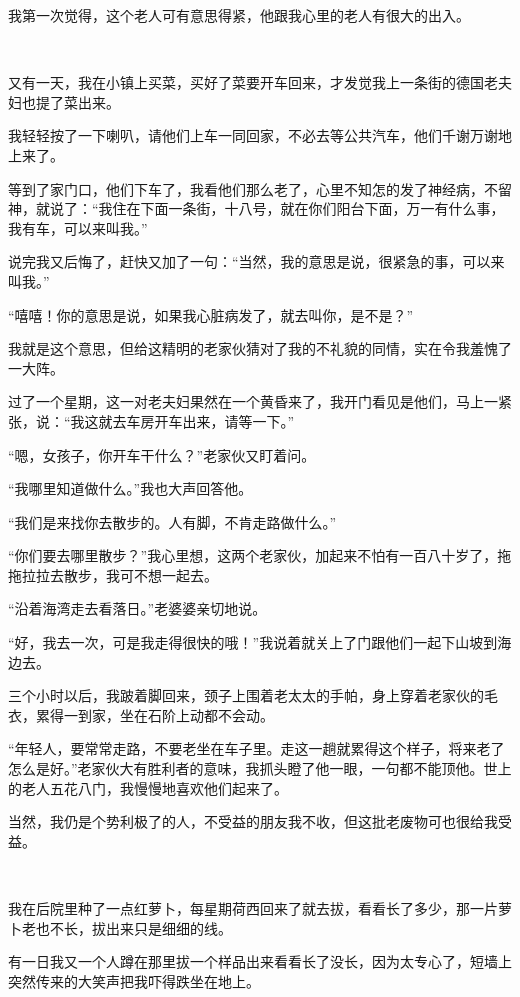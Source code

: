 \par 我第一次觉得，这个老人可有意思得紧，他跟我心里的老人有很大的出入。
\par  
\par 又有一天，我在小镇上买菜，买好了菜要开车回来，才发觉我上一条街的德国老夫妇也提了菜出来。
\par 我轻轻按了一下喇叭，请他们上车一同回家，不必去等公共汽车，他们千谢万谢地上来了。
\par 等到了家门口，他们下车了，我看他们那么老了，心里不知怎的发了神经病，不留神，就说了：“我住在下面一条街，十八号，就在你们阳台下面，万一有什么事，我有车，可以来叫我。”
\par 说完我又后悔了，赶快又加了一句：“当然，我的意思是说，很紧急的事，可以来叫我。”
\par “嘻嘻！你的意思是说，如果我心脏病发了，就去叫你，是不是？”
\par 我就是这个意思，但给这精明的老家伙猜对了我的不礼貌的同情，实在令我羞愧了一大阵。
\par 过了一个星期，这一对老夫妇果然在一个黄昏来了，我开门看见是他们，马上一紧张，说：“我这就去车房开车出来，请等一下。”
\par “嗯，女孩子，你开车干什么？”老家伙又盯着问。
\par “我哪里知道做什么。”我也大声回答他。
\par “我们是来找你去散步的。人有脚，不肯走路做什么。”
\par “你们要去哪里散步？”我心里想，这两个老家伙，加起来不怕有一百八十岁了，拖拖拉拉去散步，我可不想一起去。
\par “沿着海湾走去看落日。”老婆婆亲切地说。
\par “好，我去一次，可是我走得很快的哦！”我说着就关上了门跟他们一起下山坡到海边去。
\par 三个小时以后，我跛着脚回来，颈子上围着老太太的手帕，身上穿着老家伙的毛衣，累得一到家，坐在石阶上动都不会动。
\par “年轻人，要常常走路，不要老坐在车子里。走这一趟就累得这个样子，将来老了怎么是好。”老家伙大有胜利者的意味，我抓头瞪了他一眼，一句都不能顶他。世上的老人五花八门，我慢慢地喜欢他们起来了。
\par 当然，我仍是个势利极了的人，不受益的朋友我不收，但这批老废物可也很给我受益。
\par  
\par 我在后院里种了一点红萝卜，每星期荷西回来了就去拔，看看长了多少，那一片萝卜老也不长，拔出来只是细细的线。
\par 有一日我又一个人蹲在那里拔一个样品出来看看长了没长，因为太专心了，短墙上突然传来的大笑声把我吓得跌坐在地上。
